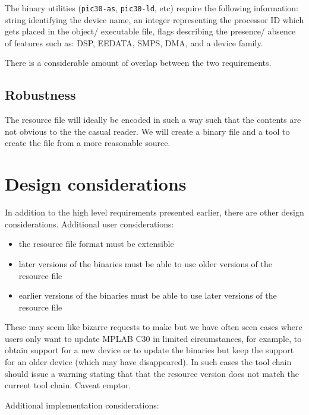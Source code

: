 \documentclass{article}
\begin{document}
  The binary utilities (\texttt{pic30-as}, \texttt{pic30-ld}, etc) require the 
  following information:  string identifying the device name, an integer 
  representing the processor ID which gets placed in the object/ executable 
  file, flags describing the presence/ absence of features such as: DSP, 
  EEDATA, SMPS, DMA, and a device family.

  There is a considerable amount of overlap between the two requirements.

\subsection{Robustness}

  The resource file will ideally be encoded in such a way such that the 
contents are not obvious to the the casual reader.  We will create a binary
file and a tool to create the file from a more reasonable source.

\section{Design considerations}

  In addition to the high level requirements presented earlier, there are
other design considerations.  Additional user considerations:

  \begin{itemize}
    \item the resource file format must be extensible
    \item later versions of the binaries must be able to use older versions
          of the resource file
    \item earlier versions of the binaries must be able to use later versions
          of the resource file
  \end{itemize}

  These may seem like bizarre requests to make but we have often seen cases
\chgbarbegin
where users only want to update MPLAB C30 in limited circumstances, for example,
\chgbarend
to obtain support for a new device or to update the binaries but keep the
support for an older device (which may have disappeared).  In such cases
the tool chain should issue a warning stating that that the resource version
does not match the current tool chain.  Caveat emptor.

  Additional implementation considerations:
\end{document}
